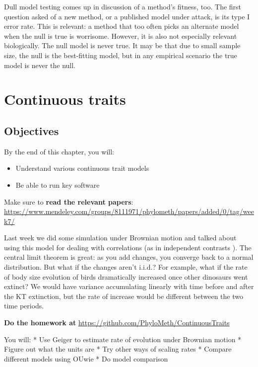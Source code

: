 \documentclass[]{book}
\providecommand{\tightlist}{%
  \setlength{\itemsep}{0pt}\setlength{\parskip}{0pt}}
\theoremstyle{definition}
\theoremstyle{definition}
\theoremstyle{remark}
\begin{document}
Dull model testing comes up in discussion of a method's fitness, too.
The first question asked of a new method, or a published model under
attack, is its type I error rate. This is relevant: a method that too
often picks an alternate model when the null is true is worrisome.
However, it is also not especially relevant biologically. The null model
is never true. It may be that due to small sample size, the null is the
best-fitting model, but in any empirical scenario the true model is
never the null.

\chapter{Continuous traits}\label{continuous-traits}

\section{Objectives}\label{objectives}

By the end of this chapter, you will:

\begin{itemize}
\tightlist
\item
  Understand various continuous trait models
\item
  Be able to run key software
\end{itemize}

Make sure to \textbf{read the relevant papers}:
\url{https://www.mendeley.com/groups/8111971/phylometh/papers/added/0/tag/week7/}

Last week we did some simulation under Brownian motion and talked about
using this model for dealing with correlations (as in independent
contrasts \citep{Felsenstein1985a}). The central limit theorem is great:
as you add changes, you converge back to a normal distribution. But what
if the changes aren't i.i.d.? For example, what if the rate of body size
evolution of birds dramatically increased once other dinosaurs went
extinct? We would have variance accumulating linearly with time before
and after the KT extinction, but the rate of increase would be different
between the two time periods.

\textbf{Do the homework at}
\url{https://github.com/PhyloMeth/ContinuousTraits}

You will: * Use Geiger to estimate rate of evolution under Brownian
motion * Figure out what the units are * Try other ways of scaling rates
* Compare different models using OUwie * Do model comparison
\end{document}
